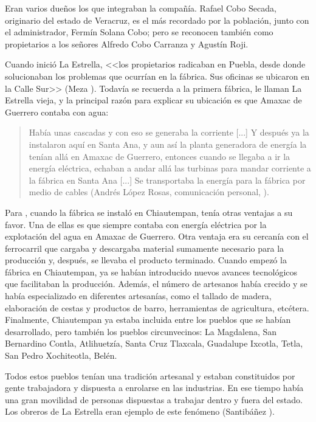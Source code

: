 \documentclass[14pt,letterpaper,twoside]{extbook} %
\begin{document}
\noindent Eran varios dueños los que integraban la compañía. Rafael Cobo Secada, originario del estado de Veracruz, es el más recordado por la población, junto con el administrador, Fermín Solana Cobo; pero se reconocen también como propietarios a los señores Alfredo Cobo Carranza y Agustín Roji.

Cuando inició La Estrella, <<los propietarios radicaban en Puebla, desde donde solucionaban los problemas que ocurrían en la fábrica. Sus oficinas se ubicaron en la Calle  Sur>> (Meza ). Todavía se recuerda a la primera fábrica, le llaman La Estrella vieja, y la principal razón para explicar su ubicación es que Amaxac de Guerrero contaba con agua:

\begin{quotation}
\noindent Había unas cascadas y con eso se generaba la corriente [...] Y después ya la instalaron aquí en Santa Ana, y aun así la planta generadora de energía la tenían allá en Amaxac de Guerrero, entonces cuando se llegaba a ir la energía eléctrica, echaban a andar allá las turbinas para mandar corriente a la fábrica en Santa Ana [...] Se transportaba la energía para la fábrica por medio de cables (Andrés López Rosas, comunicación personal, ).
\end{quotation}

\noindent Para , cuando la fábrica se instaló en Chiautempan, tenía otras ventajas a su favor. Una de ellas es que siempre contaba con energía eléctrica por la explotación del agua en Amaxac de Guerrero. Otra ventaja era su cercanía con el ferrocarril que cargaba y descargaba material sumamente necesario para la producción y, después, se llevaba el producto terminado. Cuando empezó la fábrica en Chiautempan, ya se habían introducido nuevos avances tecnológicos que facilitaban la producción. Además, el número de artesanos había crecido y se había especializado en diferentes artesanías, como el tallado de madera, elaboración de cestas y productos de barro, herramientas de agricultura, etcétera. Finalmente, Chiautempan ya estaba incluida entre los pueblos que se habían desarrollado, pero también los pueblos circunvecinos: La Magdalena, San Bernardino Contla, Atlihuetzía, Santa Cruz Tlaxcala, Guadalupe Ixcotla, Tetla, San Pedro Xochiteotla, Belén.

Todos estos pueblos tenían una tradición artesanal y estaban constituidos por gente trabajadora y dispuesta a enrolarse en las industrias. En ese tiempo había una gran movilidad de personas dispuestas a trabajar dentro y fuera del estado. Los obreros de La Estrella eran ejemplo de este fenómeno (Santibáñez ).
\end{document}
